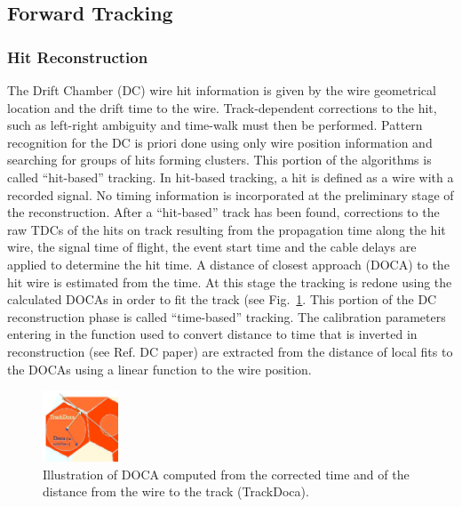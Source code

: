 \subsection{Forward Tracking}

\subsubsection{Hit Reconstruction}

The Drift Chamber (DC) wire hit information is given by the wire geometrical location and the drift time
to the wire. Track-dependent corrections to the hit, such as left-right ambiguity and time-walk must then
be performed. 
Pattern recognition for the DC is priori done using only wire position information and searching for groups of hits forming clusters.  This portion of the algorithms is called ``hit-based'' tracking.  In hit-based
tracking, a hit is defined as a wire with a recorded signal.  No timing information is incorporated at the
preliminary stage of the reconstruction.  
After a ``hit-based''  track has been found, corrections to the raw TDCs of the hits on track resulting from the propagation time along the hit wire, the signal time of flight, the event start time and the cable delays are applied to determine the hit time.  A distance of closest approach (DOCA) to the hit wire is estimated from the time.  At this stage the tracking is redone using the calculated DOCAs in order to fit the track (see Fig.~\ref{fig:docas}.  This portion of the DC reconstruction phase is called ``time-based'' tracking.  The calibration parameters entering in the function used to convert distance to time that is inverted in reconstruction (see Ref. DC paper) are extracted from the distance of local fits to the DOCAs using a linear function to the wire position. 

\begin{figure}
\centering
\includegraphics[width=0.2\textwidth]{pics/dcPattern10.png}
\caption{
Illustration of DOCA computed from the corrected time and of the distance from the wire to the track (TrackDoca).
}
\label{fig:docas}
\end{figure}

